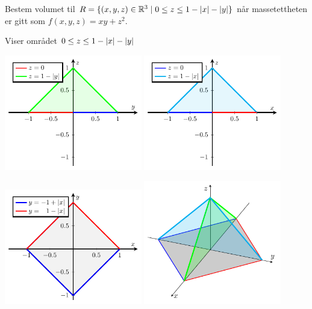 \begin{frame}
    \begin{oppgave}{}
    Bestem volumet til $R = \{ (x,y,z)\in\mathbb{R}^3 \mid 0 \leq z \leq 1 - \lvert x\rvert - \lvert y\rvert\}$ når
    massetettheten er gitt som $f(x,y,z) = xy + z^2$.
  \end{oppgave}
\end{frame}

\begin{frame}\centerline{Viser området $0 \leq z \leq 1 - \lvert x\rvert - \lvert y\rvert$}
  \centerline{%
  \includegraphics[width = 0.45\textwidth]{../img/pyramid1}%
  \includegraphics[width = 0.45\textwidth]{../img/pyramid2}}

\centerline{%
  \includegraphics[width = 0.45\textwidth]{../img/pyramid3}%
  \includegraphics[width = 0.45\textwidth]{../img/pyramid}}
\end{frame}

